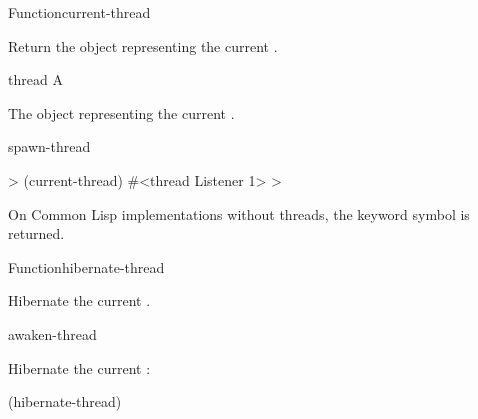 \documentclass[10pt,twoside,english,pdftex]{article}
\begin{document}
\begin{functiondoc}{Function}{current-thread}{\noargs{} 
    }
%

\fnsyntax

\fnpurpose Return the object representing the current .

\fnpackage {}

\fnmodule {}

\fnargs
\begin{args}{thread}
\arg[thread] A 
\end{args}

\fnreturns The object representing the current . 

\begin{alsos}{spawn-thread}
\end{alsos}

\fnexample
%
\W\supp
\begin{example}
  > (current-thread)
  #<thread Listener 1>
  >
\end{example}

\fnnote On Common Lisp implementations without threads,
the keyword symbol  is returned.

\end{functiondoc}


\begin{functiondoc}{Function}{hibernate-thread}{\noargs{}}
%

\fnsyntax

\fnpurpose Hibernate the current .

\fnpackage {}

\fnmodule {}

\fnerrors
\nothreads{}

\begin{alsos}{awaken-thread}
\end{alsos}

\fnexample
Hibernate the current :
%
\W\supp
\begin{example}
  (hibernate-thread)
\end{example}

\end{functiondoc}
\end{document}

